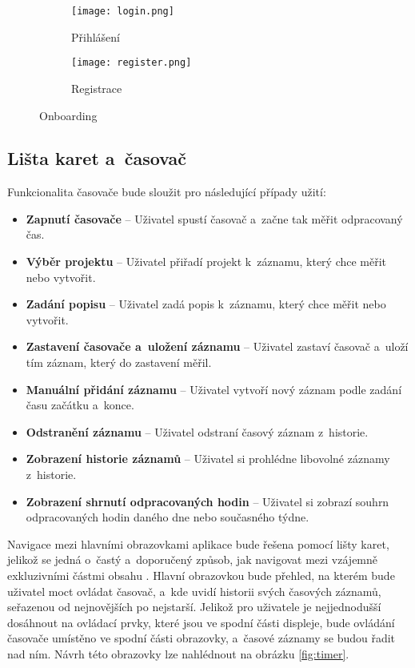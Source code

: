 \begin{figure}[h]
    \centering
    \begin{subfigure}[b]{0.4\textwidth}
		\centering
		\texttt{[image: login.png]}
		\caption{Přihlášení}
		\label{fig:login}
	\end{subfigure}
	\hspace{2cm}
	\begin{subfigure}[b]{0.4\textwidth}
		\centering
		\texttt{[image: register.png]}
		\caption{Registrace}
	\end{subfigure}
	\caption{Onboarding}
	\label{fig:onboarding}
\end{figure}

\subsection{Lišta karet a~časovač}\label{feature-timer}

Funkcionalita časovače bude sloužit pro následující případy užití:
\begin{itemize}
\item\textbf{Zapnutí časovače} – Uživatel spustí časovač a~začne tak měřit odpracovaný čas.
\item\textbf{Výběr projektu} – Uživatel přiřadí projekt k~záznamu, který chce měřit nebo vytvořit.
\item\textbf{Zadání popisu} – Uživatel zadá popis k~záznamu, který chce měřit nebo vytvořit.
\item\textbf{Zastavení časovače a~uložení záznamu} – Uživatel zastaví časovač a~uloží tím záznam, který do zastavení měřil.
\item\textbf{Manuální přidání záznamu} – Uživatel vytvoří nový záznam podle zadání času začátku a~konce.
\item\textbf{Odstranění záznamu} – Uživatel odstraní časový záznam z~historie. 
\item\textbf{Zobrazení historie záznamů} – Uživatel si prohlédne libovolné záznamy z~historie.
\item\textbf{Zobrazení shrnutí odpracovaných hodin} – Uživatel si zobrazí souhrn odpracovaných hodin daného dne nebo současného týdne.
\end{itemize}

Navigace mezi hlavními obrazovkami aplikace bude řešena pomocí lišty karet, jelikož se jedná o~častý a~doporučený způsob, jak navigovat mezi vzájemně exkluzivními částmi obsahu \cite{apple-guidelines-tabbars}. Hlavní obrazovkou bude přehled, na kterém bude uživatel moct ovládat časovač, a~kde uvidí historii svých časových záznamů, seřazenou od nejnovějších po nejstarší. Jelikož pro uživatele je nejjednodušší dosáhnout na ovládací prvky, které jsou ve spodní části displeje, bude ovládání časovače umístěno ve spodní části obrazovky, a~časové záznamy se budou řadit nad ním. Návrh této obrazovky lze nahlédnout na obrázku \ref{fig:timer}.

